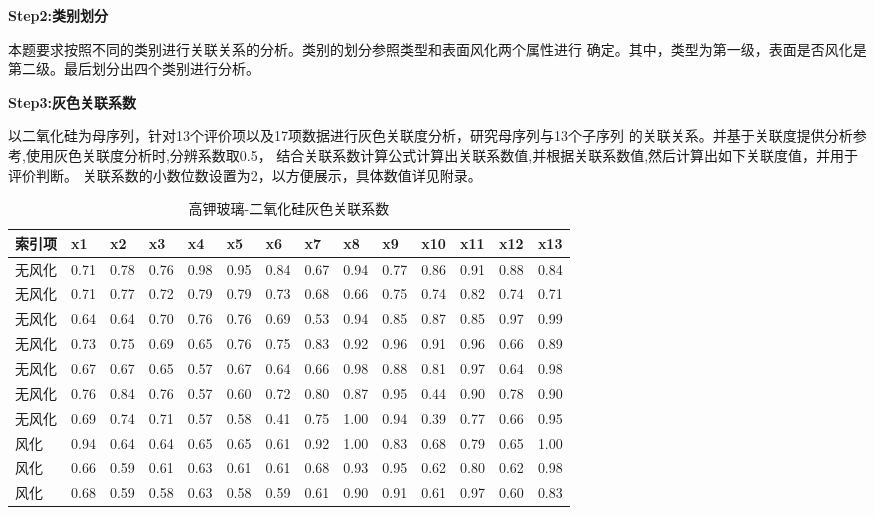 \documentclass[UTF8]{ctexart}
\begin{document}
\textbf{Step2:类别划分}

本题要求按照不同的类别进行关联关系的分析。类别的划分参照类型和表面风化两个属性进行
确定。其中，类型为第一级，表面是否风化是第二级。最后划分出四个类别进行分析。

\textbf{Step3:灰色关联系数}

以二氧化硅为母序列，针对13个评价项以及17项数据进行灰色关联度分析，研究母序列与13个子序列
的关联关系。并基于关联度提供分析参考,使用灰色关联度分析时,分辨系数取0.5，
结合关联系数计算公式计算出关联系数值,并根据关联系数值,然后计算出如下关联度值，并用于评价判断。
关联系数的小数位数设置为2，以方便展示，具体数值详见附录。
\begin{table}[!ht]
    \centering
    \caption{高钾玻璃-二氧化硅灰色关联系数}
    \begin{tabular}{|l|l|l|l|l|l|l|l|l|l|l|l|l|l|}
    \hline
        索引项 & x1 & x2 & x3 & x4 & x5 & x6 & x7 & x8 & x9 & x10 & x11 & x12 & x13 \\ \hline
        无风化 & 0.71  & 0.78  & 0.76  & 0.98  & 0.95  & 0.84  & 0.67  & 0.94  & 0.77  & 0.86  & 0.91  & 0.88  & 0.84  \\ \hline
        无风化 & 0.71  & 0.77  & 0.72  & 0.79  & 0.79  & 0.73  & 0.68  & 0.66  & 0.75  & 0.74  & 0.82  & 0.74  & 0.71  \\ \hline
        无风化 & 0.64  & 0.64  & 0.70  & 0.76  & 0.76  & 0.69  & 0.53  & 0.94  & 0.85  & 0.87  & 0.85  & 0.97  & 0.99  \\ \hline
        无风化 & 0.73  & 0.75  & 0.69  & 0.65  & 0.76  & 0.75  & 0.83  & 0.92  & 0.96  & 0.91  & 0.96  & 0.66  & 0.89  \\ \hline
        无风化 & 0.67  & 0.67  & 0.65  & 0.57  & 0.67  & 0.64  & 0.66  & 0.98  & 0.88  & 0.81  & 0.97  & 0.64  & 0.98  \\ \hline
        无风化 & 0.76  & 0.84  & 0.76  & 0.57  & 0.60  & 0.72  & 0.80  & 0.87  & 0.95  & 0.44  & 0.90  & 0.78  & 0.90  \\ \hline
        无风化 & 0.69  & 0.74  & 0.71  & 0.57  & 0.58  & 0.41  & 0.75  & 1.00  & 0.94  & 0.39  & 0.77  & 0.66  & 0.95  \\ \hline
        风化 & 0.94  & 0.64  & 0.64  & 0.65  & 0.65  & 0.61  & 0.92  & 1.00  & 0.83  & 0.68  & 0.79  & 0.65  & 1.00  \\ \hline
        风化 & 0.66  & 0.59  & 0.61  & 0.63  & 0.61  & 0.61  & 0.68  & 0.93  & 0.95  & 0.62  & 0.80  & 0.62  & 0.98  \\ \hline
        风化 & 0.68  & 0.59  & 0.58  & 0.63  & 0.58  & 0.59  & 0.61  & 0.90  & 0.91  & 0.61  & 0.97  & 0.60  & 0.83  \\ \hline

\end{tabular}
\end{table}
\end{document}
